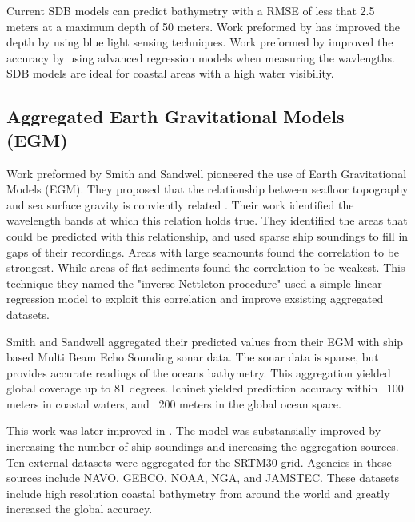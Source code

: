 \par
Current \ac{SDB} models can predict bathymetry with a \ac{RMSE} of less that 2.5 meters at a maximum depth of 50 meters.
Work preformed by \cite{vinayaraj2016satellite} has improved the depth by using blue light sensing techniques.
Work preformed by \cite{chybicki2018three} improved the accuracy by using advanced regression models when measuring the wavlengths.
\ac{SDB} models are ideal for coastal areas with a high water visibility.

\subsection{Aggregated Earth Gravitational Models (EGM)}
Work preformed by Smith and Sandwell \cite{smith1994bathymetric}\cite{smith1997global} pioneered the use of Earth Gravitational Models (EGM).
They proposed that the relationship between seafloor topography and sea surface gravity is conviently related \cite{smith1994bathymetric}.
Their work identified the wavelength bands at which this relation holds true.
They identified the areas that could be predicted with this relationship, and used sparse ship soundings to fill in gaps of their recordings.
Areas with large seamounts found the correlation to be strongest.
While areas of flat sediments found the correlation to be weakest.
This technique they named the "inverse Nettleton procedure" used a simple linear regression model to exploit this correlation and improve exsisting aggregated datasets.

\par
Smith and Sandwell aggregated their predicted values from their \ac{EGM} with ship based Multi Beam Echo Sounding sonar data.
The sonar data is sparse, but provides accurate readings of the oceans bathymetry.
This aggregation yielded global coverage up to 81 degrees.
Ichinet yielded prediction accuracy within ~100 meters in coastal waters, and ~200 meters in the global ocean space.

\par 
This work was later improved in \cite{becker2009global}.
The model was substansially improved by increasing the number of ship soundings and increasing the aggregation sources.
Ten external datasets were aggregated for the SRTM30 grid.
Agencies in these sources include \ac{NAVO}, \ac{GEBCO}, \ac{NOAA}, \ac{NGA}, and \ac{JAMSTEC}.
These datasets include high resolution coastal bathymetry from around the world and greatly increased the global accuracy.

